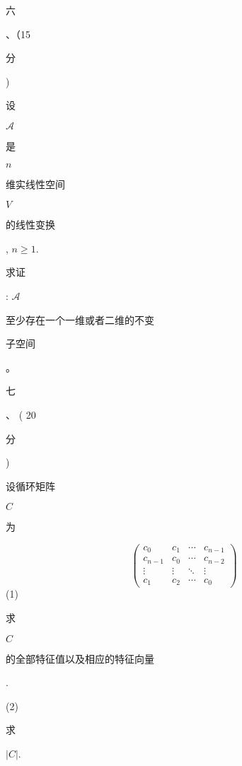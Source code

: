 \documentclass[10pt]{article}
\begin{document}
\begin{CJK}{UTF8}{mj}六\end{CJK}、（15 \begin{CJK}{UTF8}{mj}分\end{CJK}) \begin{CJK}{UTF8}{mj}设\end{CJK} $\mathcal{A}$ \begin{CJK}{UTF8}{mj}是\end{CJK} $n$ \begin{CJK}{UTF8}{mj}维实线性空间\end{CJK} $V$ \begin{CJK}{UTF8}{mj}的线性变换\end{CJK}, $n \geq 1$. \begin{CJK}{UTF8}{mj}求证\end{CJK}: $\mathcal{A}$ \begin{CJK}{UTF8}{mj}至少存在一个一维或者二维的不变\end{CJK} \begin{CJK}{UTF8}{mj}子空间\end{CJK}。

\begin{CJK}{UTF8}{mj}七\end{CJK}、 ( 20 \begin{CJK}{UTF8}{mj}分\end{CJK}) \begin{CJK}{UTF8}{mj}设循环矩阵\end{CJK} $C$ \begin{CJK}{UTF8}{mj}为\end{CJK}
$$
\left(\begin{array}{cccc}
c_{0} & c_{1} & \cdots & c_{n-1} \\
c_{n-1} & c_{0} & \cdots & c_{n-2} \\
\vdots & \vdots & \ddots & \vdots \\
c_{1} & c_{2} & \cdots & c_{0}
\end{array}\right)
$$
(1) \begin{CJK}{UTF8}{mj}求\end{CJK} $C$ \begin{CJK}{UTF8}{mj}的全部特征值以及相应的特征向量\end{CJK}.

(2) \begin{CJK}{UTF8}{mj}求\end{CJK} $|C|$.
\end{document}
